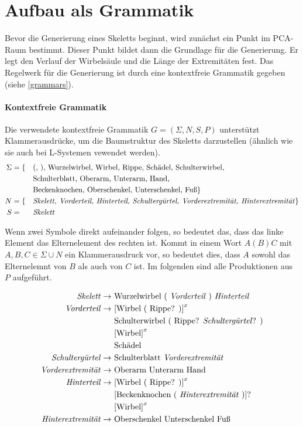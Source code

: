 \section{Aufbau als Grammatik}
\label{section:grammar}

Bevor die Generierung eines Skeletts beginnt, wird zunächst ein Punkt im PCA-Raum bestimmt. Dieser Punkt bildet dann die Grundlage für die Generierung. Er legt \zb den Verlauf der Wirbelsäule und die Länge der Extremitäten fest. Das Regelwerk für die Generierung ist durch eine kontextfreie Grammatik gegeben (siehe \ref{grammars}).

\paragraph{Kontextfreie Grammatik}
Die verwendete kontextfreie Grammatik $G = (\Sigma, N, S, P)$ unterstützt Klammerausdrücke, um die Baumstruktur des Skeletts darzustellen (ähnlich wie sie auch bei L-Systemen vewendet werden).
\begin{alignat*}{2}
 \Sigma & = \{&&\text{(, ), Wurzelwirbel, Wirbel, Rippe, Schädel, Schulterwirbel,}\\  
        & &&\text{Schulterblatt, Oberarm, Unterarm, Hand,}\\ 
        & &&\text{Beckenknochen, Oberschenkel, Unterschenkel, Fuß}\}\\
 N &= \{&&\text{\emph{Skelett, Vorderteil, Hinterteil, Schultergürtel, Vorderextremität, Hinterextremität}}\}\\
 S &= &&\text{\emph{Skelett}}
\end{alignat*}

Wenn zwei Symbole direkt aufeinander folgen, so bedeutet das, dass das linke Element das Elternelement des rechten ist. Kommt in einem Wort $A(B)C$ mit $A, B, C \in \Sigma \cup N$ ein Klammerausdruck vor, so bedeutet dies, dass $A$ sowohl das Elternelemnt von $B$ als auch von $C$ ist.
Im folgenden sind alle Produktionen aus $P$ aufgeführt.

\begin{align*}
 \text{\emph{Skelett}} \rightarrow &\text{ Wurzelwirbel ( \emph{Vorderteil} ) \emph{Hinterteil}}\\
 \text{\emph{Vorderteil}} \rightarrow &\text{ [Wirbel ( Rippe? )]}^x\\
    &\text{ Schulterwirbel ( Rippe? \emph{Schultergürtel}? )}\\
    &\text{ [Wirbel]}^x\\
    &\text{ Schädel}\\
 \text{\emph{Schultergürtel}} \rightarrow &\text{ Schulterblatt \emph{Vorderextremität}}\\
 \text{\emph{Vorderextremität}} \rightarrow &\text{ Oberarm Unterarm Hand}\\
 \text{\emph{Hinterteil}} \rightarrow &\text{ [Wirbel ( Rippe? )]}^x\\
    &\text{ [Beckenknochen ( \emph{Hinterextremität} )]?}\\
    &\text{ [Wirbel]}^x\\
 \text{\emph{Hinterextremität}} \rightarrow &\text{ Oberschenkel Unterschenkel Fuß}
\end{align*}

